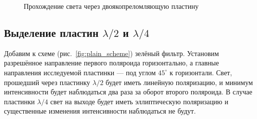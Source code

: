 \documentclass[a4paper, 12pt]{article}
\begin{document}
\begin{figure}[h!]
\begin{minipage}[h!]{0.3\linewidth}
		\end{minipage}
		\hfill
        \caption{Прохождение света через двоякопреломляющую пластину}
        \label{fig:plain_light}
\end{figure}

\newpage

\subsection{Выделение пластин $\lambda/2$ и $\lambda/4$}

Добавим к схеме (рис.~\ref{fig:plain_scheme}) зелёный фильтр. Установим разрешённое направление первого поляроида горизонтально, а главные направления исследуемой пластинки --- под углом $45^{\circ}$ к горизонтали. Свет, прошедший через пластинку $\lambda/2$ будет иметь линейную поляризацию, и минимум интенсивности будет наблюдаться два раза за оборот второго поляроида. В случае пластинки $\lambda/4$ свет на выходе будет иметь эллиптическую поляризацию и существенные изменения интенсивности наблюдаться не будут.
\end{document}

